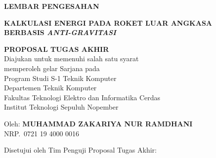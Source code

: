 \begin{center}
	\large
  \textbf{LEMBAR PENGESAHAN}
\end{center}

\thispagestyle{empty}

\begin{center}
  \textbf{KALKULASI ENERGI PADA ROKET LUAR ANGKASA BERBASIS \emph{ANTI-GRAVITASI}}
\end{center}

\begingroup
  \small

  \begin{center}
    \textbf{PROPOSAL TUGAS AKHIR} \\
    Diajukan untuk memenuhi salah satu syarat\\
    memperoleh gelar Sarjana pada \\
    Program Studi S-1 Teknik Komputer\\
    Departemen Teknik Komputer \\
    Fakultas Teknologi Elektro dan Informatika Cerdas \\
    Institut Teknologi Sepuluh Nopember
  \end{center}

  \begin{center}
    Oleh: \textbf{MUHAMMAD ZAKARIYA NUR RAMDHANI} \\
    NRP.\ 0721 19 4000 0016
  \end{center}

  \begin{center}
    Disetujui oleh Tim Penguji Proposal Tugas Akhir:
  \end{center}

  \begingroup
    \setlength{\tabcolsep}{0pt}

